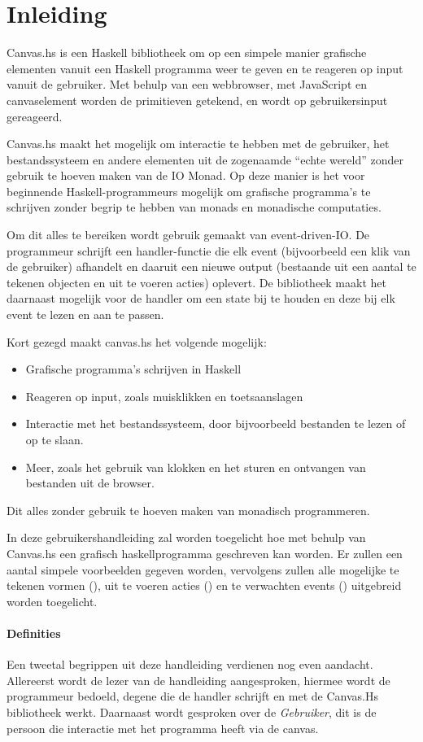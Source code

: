 \section{Inleiding}

Canvas.hs is een Haskell bibliotheek om op een simpele manier grafische elementen vanuit een Haskell programma weer te geven en te reageren op input vanuit de gebruiker. Met behulp van een webbrowser, met JavaScript en canvaselement worden de primitieven getekend, en wordt op gebruikersinput gereageerd.

Canvas.hs maakt het mogelijk om interactie te hebben met de gebruiker, het bestandssysteem en andere elementen uit de zogenaamde ``echte wereld'' zonder gebruik te hoeven maken van de IO Monad. Op deze manier is het voor beginnende Haskell-programmeurs mogelijk om grafische programma's te schrijven zonder begrip te hebben van monads en monadische computaties.

Om dit alles te bereiken wordt gebruik gemaakt van event-driven-IO. De programmeur schrijft een handler-functie die elk event (bijvoorbeeld een klik van de gebruiker) afhandelt en daaruit een nieuwe output (bestaande uit een aantal te tekenen objecten en uit te voeren acties) oplevert. De bibliotheek maakt het daarnaast mogelijk voor de handler om een state bij te houden en deze bij elk event te lezen en aan te passen. 

Kort gezegd maakt canvas.hs het volgende mogelijk:
\begin{itemize}
	\item Grafische programma's schrijven in Haskell
	\item Reageren op input, zoals muisklikken en toetsaanslagen
	\item Interactie met het bestandssysteem, door bijvoorbeeld bestanden te lezen of op te slaan.
	\item Meer, zoals het gebruik van klokken en het sturen en ontvangen van bestanden uit de browser.
\end{itemize}
Dit alles zonder gebruik te hoeven maken van monadisch programmeren. 

In deze gebruikershandleiding zal worden toegelicht hoe met behulp van Canvas.hs een grafisch haskellprogramma geschreven kan worden. Er zullen een aantal simpele voorbeelden gegeven worden, vervolgens zullen alle mogelijke te tekenen vormen (\shapes), uit te voeren acties (\actions) en te verwachten events (\events) uitgebreid worden toegelicht. 

\paragraph{Definities} 
Een tweetal begrippen uit deze handleiding verdienen nog even aandacht. Allereerst wordt de lezer van de handleiding aangesproken, hiermee wordt de programmeur bedoeld, degene die de handler schrijft en met de Canvas.Hs bibliotheek werkt. Daarnaast wordt gesproken over de \emph{Gebruiker}, dit is de persoon die interactie met het programma heeft via de canvas.